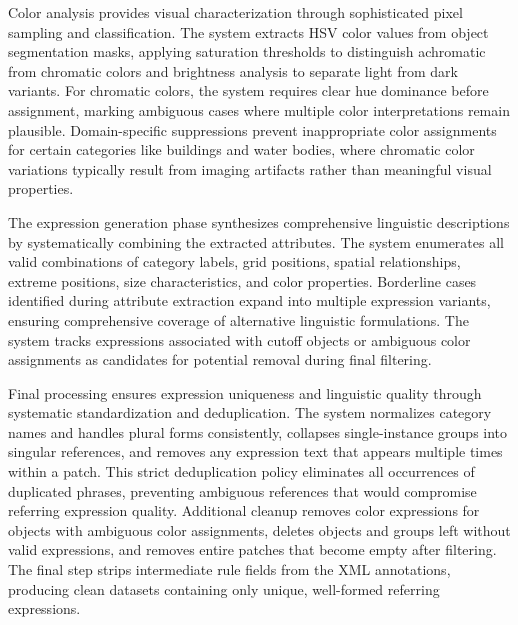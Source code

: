 Color analysis provides visual characterization through sophisticated pixel sampling and classification. The system extracts HSV color values from object segmentation masks, applying saturation thresholds to distinguish achromatic from chromatic colors and brightness analysis to separate light from dark variants. For chromatic colors, the system requires clear hue dominance before assignment, marking ambiguous cases where multiple color interpretations remain plausible. Domain-specific suppressions prevent inappropriate color assignments for certain categories like buildings and water bodies, where chromatic color variations typically result from imaging artifacts rather than meaningful visual properties.

The expression generation phase synthesizes comprehensive linguistic descriptions by systematically combining the extracted attributes. The system enumerates all valid combinations of category labels, grid positions, spatial relationships, extreme positions, size characteristics, and color properties. Borderline cases identified during attribute extraction expand into multiple expression variants, ensuring comprehensive coverage of alternative linguistic formulations. The system tracks expressions associated with cutoff objects or ambiguous color assignments as candidates for potential removal during final filtering.

Final processing ensures expression uniqueness and linguistic quality through systematic standardization and deduplication. The system normalizes category names and handles plural forms consistently, collapses single-instance groups into singular references, and removes any expression text that appears multiple times within a patch. This strict deduplication policy eliminates all occurrences of duplicated phrases, preventing ambiguous references that would compromise referring expression quality. Additional cleanup removes color expressions for objects with ambiguous color assignments, deletes objects and groups left without valid expressions, and removes entire patches that become empty after filtering. The final step strips intermediate rule fields from the XML annotations, producing clean datasets containing only unique, well-formed referring expressions.

